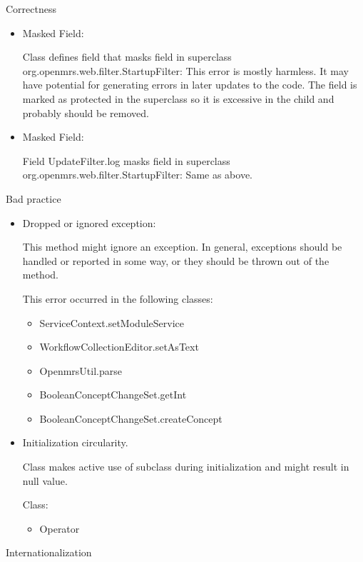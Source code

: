 \documentclass{report} %
\begin{document}
Correctness
  \begin{itemize}
    \item Masked Field:

    Class defines field that masks field in superclass
    org.openmrs.web.filter.StartupFilter:
    This error is mostly harmless. It may have potential for generating
    errors in later updates to the code. The field is marked as
    protected in the superclass so it is excessive in the child and
    probably should be removed.

    \item Masked Field:

    Field UpdateFilter.log masks field in superclass
    org.openmrs.web.filter.StartupFilter:
    Same as above.
  \end{itemize}
Bad practice
  \begin{itemize}
    \item Dropped or ignored exception:

      This method might ignore an exception. In general, exceptions
      should be handled or reported in some way, or they should be thrown
      out of the method.

      This error occurred in the following classes:

      \begin{itemize}
        \item ServiceContext.setModuleService
        \item WorkflowCollectionEditor.setAsText
        \item OpenmrsUtil.parse
        \item BooleanConceptChangeSet.getInt
        \item BooleanConceptChangeSet.createConcept
      \end{itemize}
    \item Initialization circularity. 

      Class makes active use of subclass during initialization and might
      result in null value.

      Class:

      \begin{itemize}
        \item Operator 
      \end{itemize}
  \end{itemize}
Internationalization 
\end{document}
